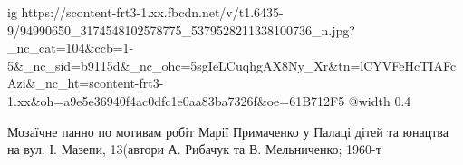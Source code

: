  
 
 
 
 

\ifcmt
  ig https://scontent-frt3-1.xx.fbcdn.net/v/t1.6435-9/94990650_3174548102578775_5379528211338100736_n.jpg?_nc_cat=104&ccb=1-5&_nc_sid=b9115d&_nc_ohc=5sgIeLCuqhgAX8Ny_Xr&tn=lCYVFeHcTIAFcAzi&_nc_ht=scontent-frt3-1.xx&oh=a9e5e36940f4ac0dfc1e0aa83ba7326f&oe=61B712F5
  @width 0.4
\fi


Мозаїчне панно по мотивам робіт Марії Примаченко у Палаці дітей та юнацтва на
вул. І. Мазепи, 13(автори А. Рибачук та В. Мельниченко; 1960-т
